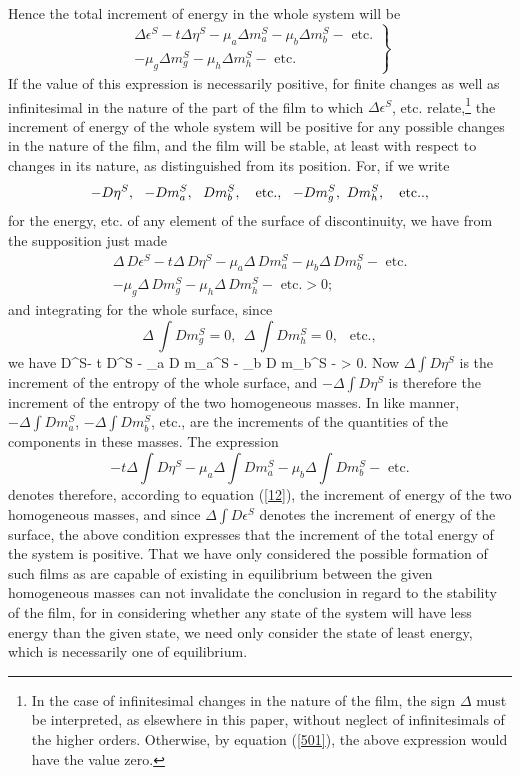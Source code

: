 \documentclass[12pt]{article}
\begin{document}
{Hence the total increment of energy in the whole system will be
\begin{equation}\left. \begin{array}{r} \Delta\epsilon^S- t \Delta \eta^S - \mu_a \Delta m_a^S - \mu_b \Delta m_b^S - \text{ etc.} \\
-  \mu_g \Delta m_g^S - \mu_h \Delta m_h^S- \text{ etc.} \label{516} \end{array} \right\}\end{equation}
If the value of this expression is necessarily positive, for finite changes as well as infinitesimal in the nature of the part of the film to which $\Delta\epsilon^S$, etc. relate,\footnote{In the case of infinitesimal changes in the nature of the film, the sign $\Delta$ must be interpreted, as elsewhere in this paper, without neglect of infinitesimals of the higher orders. Otherwise, by equation (\ref{501}), the above expression would have the value zero.} the increment of energy of the whole system will be positive for any possible changes in the nature of the film, and the film will be stable, at least with respect to changes in its nature, as distinguished from its position. For, if we write
$$ -D \eta^S, \ \ -D m_a^S,\ \ D m_b^S, \ \ \text{ etc.}, \ \ -D m_g^S, \ \-D m_h^S, \ \ \text{ etc.}.,$$
for the energy, etc. of any element of the surface of discontinuity, we have from the supposition just made
\begin{align}\Delta\, D\epsilon^S- t \Delta \, D\eta^S - \mu_a \Delta \, D m_a^S - \mu_b \Delta \, D m_b^S - \text{ etc.} \nonumber \\
- \mu_g \Delta \, D m_g^S - \mu_h \Delta \, D m_h^S- \text{ etc.}> 0;          \label{517}\end{align}
and integrating for the whole surface, since
$$ \Delta \, \int D m_g^S = 0,\ \ \Delta \, \int D m_h^S = 0,\ \ \text{ etc.}, $$
we have
\eqs \Delta \int D\epsilon^S- t \Delta \int D\eta^S - \mu_a \Delta \int D m_a^S - \mu_b \Delta \int D m_b^S -  > 0.   \label{518} \eqe
Now $\Delta \int D\eta^S$ is the increment of the entropy of the whole surface, and $- \Delta \int D\eta^S$ is therefore the increment of the entropy of the two homogeneous masses. In like manner, $- \Delta \int D m_a^S$, $- \Delta \int D m_b^S$, etc., are the increments of the quantities of the components in these masses. The expression
$$ - t \Delta \int D\eta^S - \mu_a \Delta \int D m_a^S - \mu_b \Delta \int D m_b^S - \text{ etc.} $$
denotes therefore, according to equation (\ref{12}), the increment of energy of the two homogeneous masses, and since $\Delta \int D\epsilon^S$ denotes the
increment of energy of the surface, the above condition expresses that the increment of the total energy of the system is positive. That we have only considered the possible formation of such films as are capable of existing in equilibrium between the given homogeneous masses can not invalidate the conclusion in regard to the stability of the film, for in considering whether any state of the system will have less energy than the given state, we need only consider the state of least energy, which is necessarily one of equilibrium.

}
\end{document}

